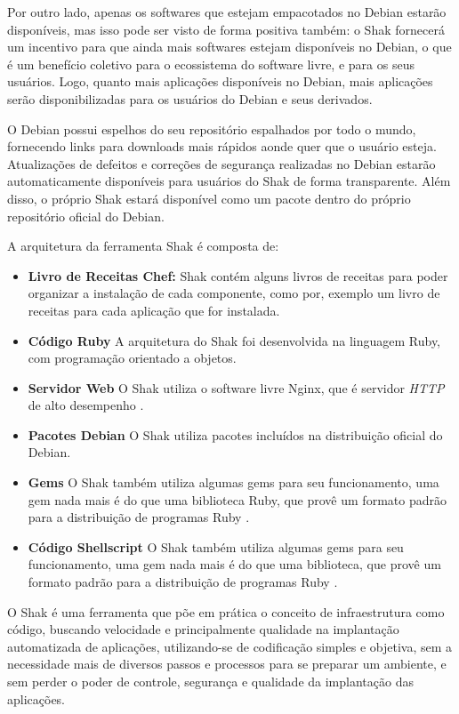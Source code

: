 Por outro lado, apenas os softwares que estejam empacotados no Debian estarão
disponíveis, mas isso pode ser visto de forma positiva também: o Shak
fornecerá um incentivo para que ainda mais softwares estejam disponíveis no
Debian, o que é um benefício coletivo para o ecossistema do software livre, e
para os seus usuários. Logo, quanto mais aplicações disponíveis no Debian,
mais aplicações serão disponibilizadas para os usuários do Debian e seus derivados.

O Debian possui espelhos do seu repositório espalhados por todo o mundo,
fornecendo links para downloads mais rápidos aonde quer que o usuário esteja.
Atualizações de defeitos e correções de segurança realizadas no Debian estarão
automaticamente disponíveis para usuários do Shak de forma transparente. Além disso,
o próprio Shak estará disponível como um pacote dentro do próprio repositório oficial do Debian.

A arquitetura da ferramenta Shak é composta de:

\begin{itemize}
  \item  \textbf{Livro de Receitas Chef:} Shak contém alguns livros de receitas
  para poder organizar a instalação de cada componente, como por, exemplo um livro
  de receitas para cada aplicação que for instalada.
  \item  \textbf{Código Ruby} A arquitetura do Shak foi desenvolvida na linguagem
  Ruby, com programação orientado a objetos.
  \item  \textbf{Servidor Web} O Shak utiliza o software livre Nginx, que é
  servidor \textit{HTTP} de alto desempenho \cite{nginx}.
  \item  \textbf{Pacotes Debian} O Shak utiliza pacotes incluídos na distribuição
  oficial do Debian.
  \item  \textbf{Gems} O Shak também utiliza algumas gems para seu funcionamento,
  uma gem nada mais é do que uma biblioteca Ruby, que provê um formato padrão para
  a distribuição de programas Ruby \cite{gem}.
  \item  \textbf{Código Shellscript} O Shak também utiliza algumas gems para seu funcionamento,
  uma gem nada mais é do que uma biblioteca, que provê um formato padrão para
  a distribuição de programas Ruby \cite{gem}.
\end{itemize}

O Shak é uma ferramenta que põe em prática o conceito de infraestrutura
como código, buscando velocidade e principalmente qualidade na implantação
automatizada de aplicações, utilizando-se de codificação simples e objetiva, 
sem a necessidade mais de diversos passos e processos para se preparar um ambiente, 
e sem perder o poder de controle, segurança e qualidade da implantação das aplicações.

